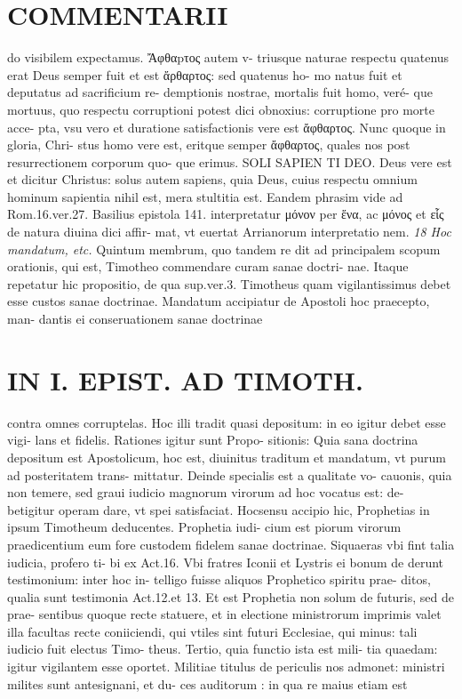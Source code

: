 \documentclass{article}
\begin{document}
\begin{pages}
\section*{COMMENTARII }\pstart do visibilem expectamus. Ἄφθαpτος autem v- triusque naturae respectu quatenus erat Deus semper fuit et est ἄρθαρτος: sed quatenus ho- mo natus fuit et deputatus ad sacrificium re- demptionis nostrae, mortalis fuit homo, veré- que mortuus, quo respectu corruptioni potest dici obnoxius: corruptione pro morte acce- pta, vsu vero et duratione satisfactionis vere est ἄφθαρτος. Nunc quoque in gloria, Chri- stus homo vere est, eritque semper ἄφθαρτος, quales nos post resurrectionem corporum quo- que erimus. SOLI SAPIEN TI DEO. Deus vere est et dicitur Christus: solus autem sapiens, quia Deus, cuius respectu omnium hominum sapientia nihil est, mera stultitia est. Eandem phrasim vide ad Rom.16.ver.27. Basilius epistola 141. interpretatur μόνον per ἕνα, ac μόνος et εἷς  de natura diuina dici affir- mat, vt euertat Arrianorum interpretatio nem.  \pend
\textit{18 Hoc mandatum, etc. }\pstart Quintum membrum, quo tandem re dit ad principalem scopum orationis, qui est, Timotheo commendare curam sanae doctri- nae. Itaque repetatur hic propositio, de qua sup.ver.3. Timotheus quam vigilantissimus debet esse custos sanae doctrinae. Mandatum accipiatur de Apostoli hoc praecepto, man- dantis ei conseruationem sanae doctrinae  \pend
\section*{IN I. EPIST. AD TIMOTH. }
\marginpar{[ p.39 ]}\pstart contra omnes corruptelas. Hoc illi tradit quasi depositum: in eo igitur debet esse vigi- lans et fidelis. Rationes igitur sunt Propo- sitionis: Quia sana doctrina depositum est Apostolicum, hoc est, diuinitus traditum et mandatum, vt purum ad posteritatem trans- mittatur. Deinde specialis est a qualitate vo- cauonis, quia non temere, sed graui iudicio magnorum virorum ad hoc vocatus est: de- betigitur operam dare, vt spei satisfaciat. Hocsensu accipio hic, Prophetias in ipsum Timotheum deducentes. Prophetia iudi- cium est piorum virorum praedicentium eum fore custodem fidelem sanae doctrinae.  \pend\pstart Siquaeras vbi fint talia iudicia, profero ti- bi ex Act.16. Vbi fratres Iconii et Lystris ei bonum de derunt testimonium: inter hoc in- telligo fuisse aliquos Prophetico spiritu prae- ditos, qualia sunt testimonia Act.12.et 13. Et est Prophetia non solum de futuris, sed de prae- sentibus quoque recte statuere, et in electione ministrorum imprimis valet illa facultas recte coniiciendi, qui vtiles sint futuri Ecclesiae, qui minus: tali iudicio fuit electus Timo- theus. Tertio, quia functio ista est mili- tia quaedam: igitur vigilantem esse oportet. Militiae titulus de periculis nos admonet: ministri milites sunt antesignani, et du- ces auditorum : in qua re maius etiam est  \pend
\marginpar{[ p.40 ]}

\end{pages}
\end{document}
